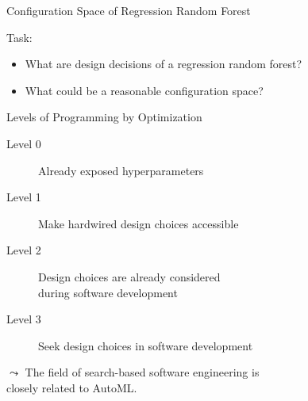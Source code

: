 \begin{frame}{Configuration Space of Regression Random Forest}

Task: \hands [5min]
\begin{itemize}
  \item What are design decisions of a regression random forest?
  \item What could be a reasonable configuration space?  
\end{itemize}



\end{frame}
\begin{frame}[c]{Levels of Programming by Optimization }

\begin{description}
\item[Level 0] Already exposed hyperparameters
\pause
\item[Level 1] Make hardwired design choices accessible
\pause
\item[Level 2] Design choices are already considered\\ during software development
\pause 
\item[Level 3] Seek design choices in software development
\end{description}

\pause
\bigskip

$\leadsto$ The field of search-based software engineering is\\ closely related to AutoML.

\end{frame}
